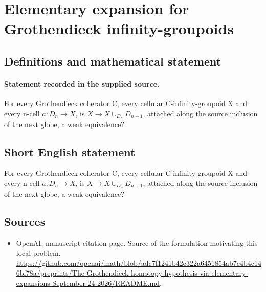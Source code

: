 \documentclass[11pt]{article}
\begin{document}
\section*{Elementary expansion for Grothendieck infinity-groupoids}\label{statement}
\subsection{Definitions and mathematical statement}
\paragraph{Statement recorded in the supplied source.}
For every Grothendieck coherator C, every cellular C-infinity-groupoid X and every n-cell $a:D_n\to X$, is $X\to X\cup _{D_n}D_{n+1}$, attached along the source inclusion of the next globe, a weak equivalence?
\subsection{Short English statement}
For every Grothendieck coherator C, every cellular C-infinity-groupoid X and every n-cell $a:D_n\to X$, is $X\to X\cup _{D_n}D_{n+1}$, attached along the source inclusion of the next globe, a weak equivalence?
\subsection{Sources}
\begin{itemize}
\item[S1] OpenAI, manuscript citation page. Source of the formulation motivating this local problem.
\url{https://github.com/openai/math/blob/adc7f1241b42e322a6451854ab7e4b4c146bf78a/preprints/The-Grothendieck-homotopy-hypothesis-via-elementary-expansions-September-24-2026/README.md}.
\end{itemize}
\end{document}

